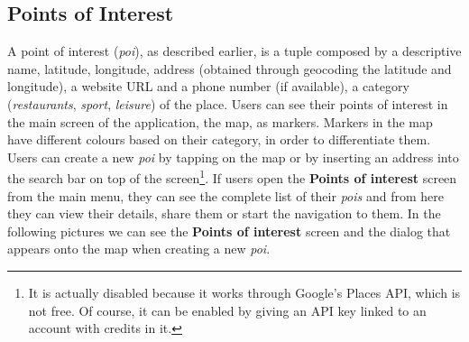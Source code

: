 \documentclass[../../main]{subfiles}
\begin{document}
\subsection{Points of Interest}
\label{ss:final-poi}

A point of interest (\textit{poi}), as described earlier, is a tuple composed by a descriptive name, latitude, longitude, address (obtained through geocoding the latitude and longitude), a website URL and a phone number (if available), a category (\textit{restaurants}, \textit{sport}, \textit{leisure}) of the place.
Users can see their points of interest in the main screen of the application, the map, as markers.
Markers in the map have different colours based on their category, in order to differentiate them.
Users can create a new \textit{poi} by tapping on the map or by inserting an address into the search bar on top of the screen\footnote{It is actually disabled because it works through Google's Places API, which is not free. Of course, it can be enabled by giving an API key linked to an account with credits in it.}.
If users open the \textbf{Points of interest} screen from the main menu, they can see the complete list of their \textit{pois} and from here they can view their details, share them or start the navigation to them.
In the following pictures we can see the \textbf{Points of interest} screen and the dialog that appears onto the map when creating a new \textit{poi}.
\end{document}
